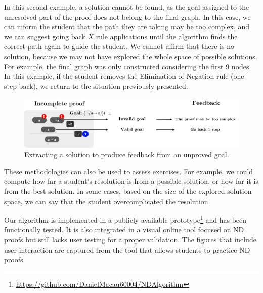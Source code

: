 In this second example, a solution cannot be found, as the goal assigned to the unresolved part of the proof does not belong to the final graph. In this case, we can inform the student that the path they are taking may be too complex, and we can suggest going back \(X\) rule applications until the algorithm finds the correct path again to guide the student. We cannot affirm that there is no solution, because we may not have explored the whole space of possible solutions. For example, the final graph was only constructed considering the first 9 nodes. In this example, if the student removes the Elimination of Negation rule (one step back), we return to the situation previously presented.
\begin{figure}[t]
    \centering
    \includegraphics[width=1\linewidth]{resources/trim-neg-feed.jpg}
    \caption{Extracting a solution to produce feedback from an unproved goal.}
    \label{fig:extract-solution2}
\end{figure}
These methodologies can also be used to assess exercises. For example, we could compute how far a student’s resolution is from a possible solution, or how far it is from the best solution. In some cases, based on the size of the explored solution space, we can say that the student overcomplicated the resolution.

Our algorithm is implemented in a publicly available prototype\footnote{\url{https://github.com/DanielMacau60004/NDAlgorithm}} and has been functionally tested. It is also integrated in a visual online tool focused on ND proofs but still lacks user testing for a proper validation. The figures that include user interaction are captured from the tool that allows students to practice ND proofs.
